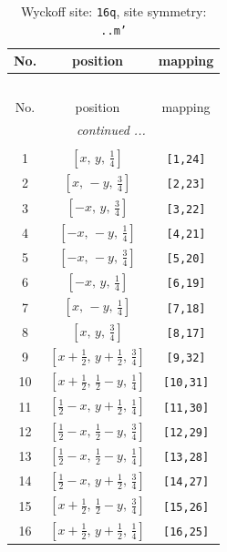 \documentclass[fleqn,8pt]{jsarticle}
\begin{document}
\renewcommand{\arraystretch}{1.2}
\begin{longtable}{ccc}
\caption{Wyckoff site: {\tt 16q}, site symmetry: {\tt ..m'}}
 \\
 \hline \hline
No. & position & mapping \\ \hline \endfirsthead

\multicolumn{2}{l}{\tablename\ \thetable{}} \\
 \hline \hline
No. & position & mapping \\ \hline \endhead

 \hline \hline
\multicolumn{2}{r}{\footnotesize\it continued ...} \\ \endfoot

 \hline \hline
\multicolumn{2}{r}{} \\ \endlastfoot

1 & $\left[ x,\, y,\, \frac{1}{4} \right]$ & {\tt [1,24]} \\ \hline
2 & $\left[ x,\, - y,\, \frac{3}{4} \right]$ & {\tt [2,23]} \\ \hline
3 & $\left[ - x,\, y,\, \frac{3}{4} \right]$ & {\tt [3,22]} \\ \hline
4 & $\left[ - x,\, - y,\, \frac{1}{4} \right]$ & {\tt [4,21]} \\ \hline
5 & $\left[ - x,\, - y,\, \frac{3}{4} \right]$ & {\tt [5,20]} \\ \hline
6 & $\left[ - x,\, y,\, \frac{1}{4} \right]$ & {\tt [6,19]} \\ \hline
7 & $\left[ x,\, - y,\, \frac{1}{4} \right]$ & {\tt [7,18]} \\ \hline
8 & $\left[ x,\, y,\, \frac{3}{4} \right]$ & {\tt [8,17]} \\ \hline
9 & $\left[ x + \frac{1}{2},\, y + \frac{1}{2},\, \frac{3}{4} \right]$ & {\tt [9,32]} \\ \hline
10 & $\left[ x + \frac{1}{2},\, \frac{1}{2} - y,\, \frac{1}{4} \right]$ & {\tt [10,31]} \\ \hline
11 & $\left[ \frac{1}{2} - x,\, y + \frac{1}{2},\, \frac{1}{4} \right]$ & {\tt [11,30]} \\ \hline
12 & $\left[ \frac{1}{2} - x,\, \frac{1}{2} - y,\, \frac{3}{4} \right]$ & {\tt [12,29]} \\ \hline
13 & $\left[ \frac{1}{2} - x,\, \frac{1}{2} - y,\, \frac{1}{4} \right]$ & {\tt [13,28]} \\ \hline
14 & $\left[ \frac{1}{2} - x,\, y + \frac{1}{2},\, \frac{3}{4} \right]$ & {\tt [14,27]} \\ \hline
15 & $\left[ x + \frac{1}{2},\, \frac{1}{2} - y,\, \frac{3}{4} \right]$ & {\tt [15,26]} \\ \hline
16 & $\left[ x + \frac{1}{2},\, y + \frac{1}{2},\, \frac{1}{4} \right]$ & {\tt [16,25]} \\
\end{longtable}
\end{document}
